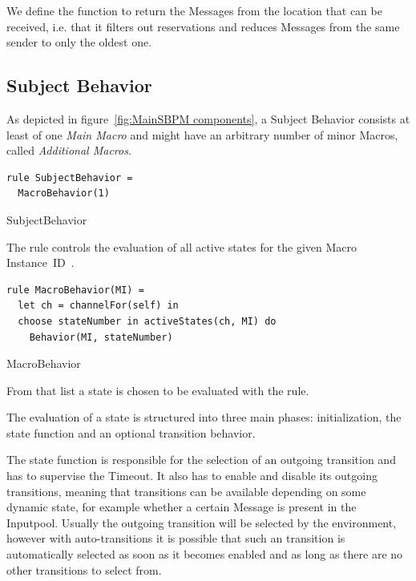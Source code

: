We define the function  to return the
Messages from the location  that can be received, i.e. that it
filters out reservations and reduces Messages from the same sender to only
the oldest one.

\subsection{Subject Behavior}


As depicted in figure~\ref{fig:MainSBPM components}, a Subject Behavior consists at least of one \textit{Main Macro}
and might have an arbitrary number of minor Macros, called \textit{Additional Macros}.

\begin{listing}[htbp]
\begin{verbatim}
rule SubjectBehavior =
  MacroBehavior(1)
\end{verbatim}
\caption{SubjectBehavior}
\label{lst:shortasm:SubjectBehavior}
\end{listing}




The  rule controls the evaluation of all active
states for the given Macro Instance~ID~.


\begin{listing}[htbp]
\begin{verbatim}
rule MacroBehavior(MI) =
  let ch = channelFor(self) in
  choose stateNumber in activeStates(ch, MI) do
    Behavior(MI, stateNumber)
\end{verbatim}
\caption{MacroBehavior}
\label{lst:shortasm:MacroBehavior}
\end{listing}

From that list a state  is chosen to be evaluated with the  rule.



The evaluation of a state is structured into three main phases: initialization,
the state function and an optional transition behavior.

The state function is responsible for the selection of an outgoing transition and
has to supervise the Timeout. It also has to enable and disable its outgoing
transitions, meaning that transitions can be available depending on some dynamic state,
for example whether a certain Message is present in the Inputpool.
Usually the outgoing transition will be selected by the environment, however with
auto-transitions it is possible that such an transition is automatically selected as soon
as it becomes enabled and as long as there are no other transitions to select from.


